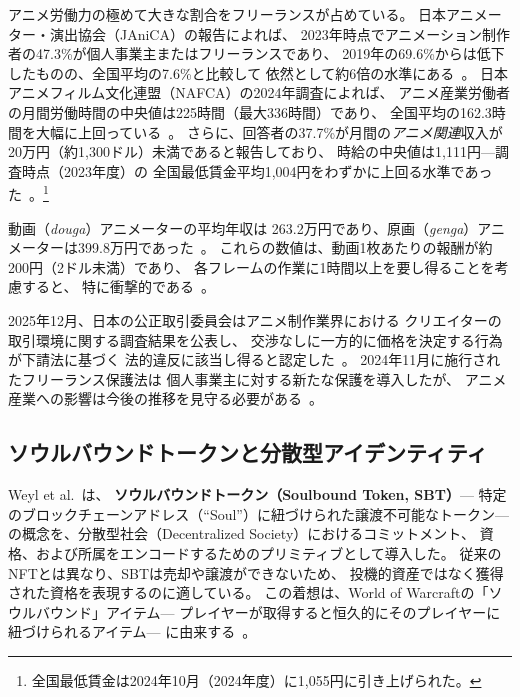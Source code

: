 アニメ労働力の極めて大きな割合をフリーランスが占めている。
日本アニメーター・演出協会（JAniCA）の報告によれば、
2023年時点でアニメーション制作者の47.3\%が個人事業主またはフリーランスであり、
2019年の69.6\%からは低下したものの、全国平均の7.6\%と比較して
依然として約6倍の水準にある~\cite{janica2023survey}。
日本アニメフィルム文化連盟（NAFCA）の2024年調査によれば、
アニメ産業労働者の月間労働時間の中央値は225時間（最大336時間）であり、
全国平均の162.3時間を大幅に上回っている~\cite{nafca2024survey}。
さらに、回答者の37.7\%が月間の\emph{アニメ関連}収入が
20万円（約1{,}300ドル）未満であると報告しており、
時給の中央値は1{,}111円---調査時点（2023年度）の
全国最低賃金平均1{,}004円をわずかに上回る水準であった~\cite{nafca2024labor}。\footnote{全国最低賃金は2024年10月（2024年度）に1{,}055円に引き上げられた。}

動画（\textit{douga}）アニメーターの平均年収は
263.2万円であり、原画（\textit{genga}）アニメーターは399.8万円であった~\cite{janica2023survey}。
これらの数値は、動画1枚あたりの報酬が約200円（2ドル未満）であり、
各フレームの作業に1時間以上を要し得ることを考慮すると、
特に衝撃的である~\cite{adler2020blood}。

2025年12月、日本の公正取引委員会はアニメ制作業界における
クリエイターの取引環境に関する調査結果を公表し、
交渉なしに一方的に価格を決定する行為が下請法に基づく
法的違反に該当し得ると認定した~\cite{jftc2025anime}。
2024年11月に施行されたフリーランス保護法は
個人事業主に対する新たな保護を導入したが、
アニメ産業への影響は今後の推移を見守る必要がある~\cite{meti2025anime}。

\subsection{ソウルバウンドトークンと分散型アイデンティティ}
\label{subsec:sbt}

Weyl et al.~\cite{buterin2022decentralized}は、
\textbf{ソウルバウンドトークン（Soulbound Token, SBT）}---
特定のブロックチェーンアドレス（``Soul''）に紐づけられた譲渡不可能なトークン---
の概念を、分散型社会（Decentralized Society）におけるコミットメント、
資格、および所属をエンコードするためのプリミティブとして導入した。
従来のNFTとは異なり、SBTは売却や譲渡ができないため、
投機的資産ではなく獲得された資格を表現するのに適している。
この着想は、World of Warcraftの「ソウルバウンド」アイテム---
プレイヤーが取得すると恒久的にそのプレイヤーに紐づけられるアイテム---
に由来する~\cite{buterin2022soulbound}。


